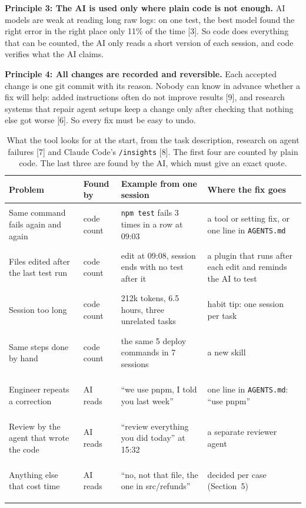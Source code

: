 \documentclass[10pt,twocolumn]{article}
\newcommand{\chip}[2]{\colorbox{#1}{\strut\scriptsize #2}}
\begin{document}
\textbf{Principle 3: The AI is used only where plain code is not enough.} AI models are weak at reading long raw logs: on one test, the best model found the right error in the right place only 11\% of the time [3]. So code does everything that can be counted, the AI only reads a short version of each session, and code verifies what the AI claims.

\textbf{Principle 4: All changes are recorded and reversible.} Each accepted change is one git commit with its reason. Nobody can know in advance whether a fix will help: added instructions often do not improve results [9], and research systems that repair agent setups keep a change only after checking that nothing else got worse [6]. So every fix must be easy to undo.

\begin{table}[t]
\centering
{\footnotesize
\begin{tabularx}{\textwidth}{@{}>{\raggedright\arraybackslash}p{3.6cm} >{\raggedright\arraybackslash}p{1.6cm} >{\raggedright\arraybackslash}X >{\raggedright\arraybackslash}X@{}}
\toprule
\textbf{Problem} & \textbf{Found by} & \textbf{Example from one session} & \textbf{Where the fix goes}\\
\midrule
Same command fails again and again & \chip{code}{code count} & \texttt{npm test} fails 3 times in a row at 09:03 & a tool or setting fix, or one line in \texttt{AGENTS.md} \\
Files edited after the last test run & \chip{code}{code count} & edit at 09:08, session ends with no test after it & a plugin that runs after each edit and reminds the AI to test \\
Session too long & \chip{code}{code count} & 212k tokens, 6.5 hours, three unrelated tasks & habit tip: one session per task \\
Same steps done by hand & \chip{code}{code count} & the same 5 deploy commands in 7 sessions & a new skill \\
Engineer repeats a correction & \chip{ai}{AI reads} & ``we use pnpm, I told you last week'' & one line in \texttt{AGENTS.md}: ``use pnpm'' \\
Review by the agent that wrote the code & \chip{ai}{AI reads} & ``review everything you did today'' at 15:32 & a separate reviewer agent \\
Anything else that cost time & \chip{ai}{AI reads} & ``no, not that file, the one in src/refunds'' & decided per case (Section~5) \\
\bottomrule
\end{tabularx}}
\caption{What the tool looks for at the start, from the task description, research on agent failures [7] and Claude Code's \texttt{/insights} [8]. The first four are counted by plain code. The last three are found by the AI, which must give an exact quote.}
\label{tab:checks}
\end{table}
\end{document}
